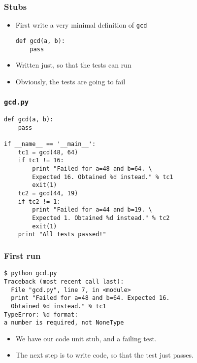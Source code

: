 \documentclass[12pt,presentation]{beamer}
\begin{document}
\begin{frame}[fragile]
  \frametitle{Stubs}
  \begin{itemize}
  \item First write a very minimal definition of \texttt{gcd}
    \begin{lstlisting}
def gcd(a, b):
    pass
    \end{lstlisting}
  \item Written just, so that the tests can run
  \item Obviously, the tests are going to fail
  \end{itemize}
\end{frame}

\begin{frame}[fragile]
  \frametitle{\texttt{gcd.py}}
\begin{lstlisting}
def gcd(a, b):
    pass

if __name__ == '__main__':
    tc1 = gcd(48, 64)
    if tc1 != 16:
        print "Failed for a=48 and b=64. \
        Expected 16. Obtained %d instead." % tc1
        exit(1)
    tc2 = gcd(44, 19)
    if tc2 != 1:
        print "Failed for a=44 and b=19. \
        Expected 1. Obtained %d instead." % tc2
        exit(1)
    print "All tests passed!"
\end{lstlisting}
\end{frame}

\begin{frame}[fragile]
  \frametitle{First run}
\begin{lstlisting}
$ python gcd.py
Traceback (most recent call last):
  File "gcd.py", line 7, in <module> 
  print "Failed for a=48 and b=64. Expected 16. 
  Obtained %d instead." % tc1
TypeError: %d format: 
a number is required, not NoneType
\end{lstlisting} %

  \begin{itemize}
  \item We have our code unit stub, and a failing test. 
  \item The next step is to write code, so that the test just passes.
  \end{itemize}
\end{frame}
\end{document}
